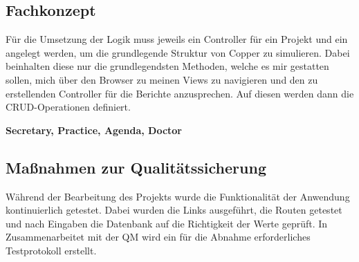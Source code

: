 \subsection{Fachkonzept}
\label{sec:Geschäftslogik}
Für die Umsetzung der Logik muss jeweils ein Controller für ein Projekt und ein angelegt werden, um die grundlegende Struktur von Copper zu simulieren. Dabei beinhalten diese nur die grundlegendsten Methoden, welche es mir gestatten sollen, mich über den Browser zu meinen Views zu navigieren und den zu erstellenden Controller für die Berichte anzusprechen. Auf diesen werden dann die CRUD-Operationen definiert. 

\textbf{Secretary, Practice, Agenda, Doctor}

\subsection{Maßnahmen zur Qualitätssicherung}
\label{sec:Qualitaetssicherung}
Während der Bearbeitung des Projekts wurde die Funktionalität der Anwendung kontinuierlich getestet. Dabei wurden die Links ausgeführt, die Routen getestet und nach Eingaben die Datenbank auf die Richtigkeit der Werte geprüft. In Zusammenarbeitet mit der QM wird ein für die Abnahme erforderliches Testprotokoll erstellt.

